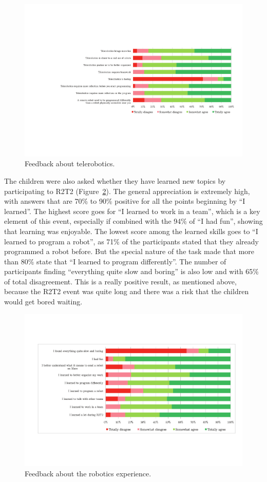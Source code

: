 \documentclass{intech-journal}
\begin{document}
\begin{figure}[ht]
 \centering
    \includegraphics[width=\columnwidth]{figures/telerobotics.pdf}
  \caption{Feedback about telerobotics.}
  \label{fig:tele} 
\end{figure}

The children were also asked whether they have learned new topics by participating to R2T2 (Figure~\ref{fig:robotics}). 
The general appreciation is extremely high, with answers that are 70\% to 90\% positive for all the points beginning by ``I learned''. 
The highest score goes for ``I learned to work in a team'', which is a key element of this event, especially if combined with the 94\% of ``I had fun'', showing that learning was enjoyable.
The lowest score among the learned skills goes to ``I learned to program a robot'', as 71\% of the participants stated that they already programmed a robot before.
But the special nature of the task made that more than 80\% state that ``I learned to program differently''.
The number of participants finding ``everything quite slow and boring'' is also low and with 65\% of total disagreement. 
This is a really positive result, as mentioned above, because the R2T2 event was quite long and there was a risk that the children would get bored waiting. 

\begin{figure}[ht]
 \centering
    \includegraphics[width=0.9\columnwidth]{figures/robotics.pdf}
  \caption{Feedback about the robotics experience.}
  \label{fig:robotics} 
\end{figure}
\end{document}

